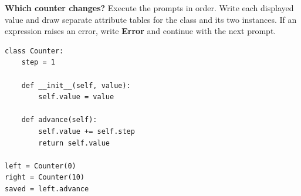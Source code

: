 \begin{blocksection}
\question \textbf{Which counter changes?} Execute the prompts in order.
Write each displayed value and draw separate attribute tables for the class
and its two instances. If an expression raises an error, write \textbf{Error}
and continue with the next prompt.

\begin{lstlisting}
class Counter:
    step = 1

    def __init__(self, value):
        self.value = value

    def advance(self):
        self.value += self.step
        return self.value

left = Counter(0)
right = Counter(10)
saved = left.advance
\end{lstlisting}
\end{blocksection}

